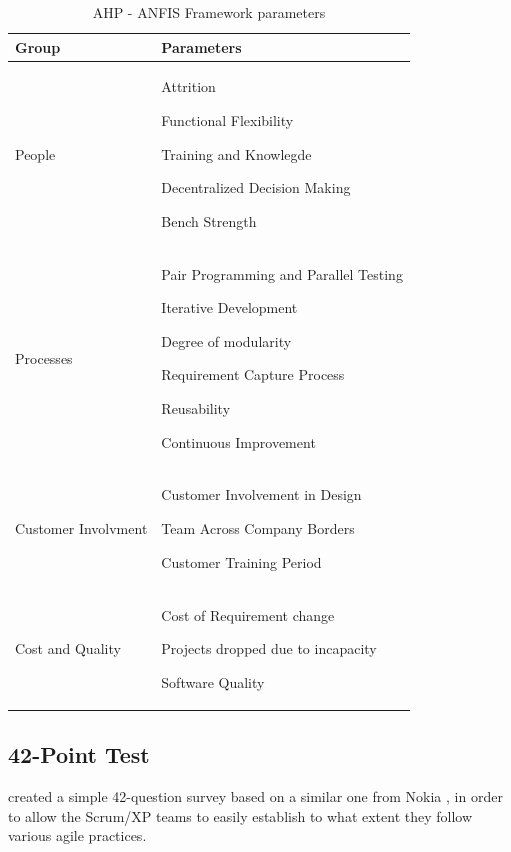 \begin{table} [H]
\begin{tabular}{| p{3cm} | p{12cm}|}
    \hline
     \textbf{Group} & \textbf{Parameters} \\ \hline
     People  &  \begin{inparaenum} [a\upshape)] \item Attrition \item Functional Flexibility \item Training and Knowlegde \item Decentralized Decision Making \item Bench Strength \end{inparaenum} \\ \hline
     Processes  & \begin{inparaenum} [a\upshape)] \item Pair Programming and Parallel Testing \item Iterative Development \item Degree of modularity \item Requirement Capture Process \item Reusability \item Continuous Improvement
     \end{inparaenum} \\ \hline
    Customer Involvment & \begin{inparaenum} [a\upshape)] \item Customer Involvement in Design \item Team Across Company Borders \item Customer Training Period \end{inparaenum} \\ \hline
     Cost and Quality  & \begin{inparaenum} [a\upshape)] \item Cost of Requirement change \item Projects dropped due to incapacity \item Software Quality \end{inparaenum} \\ \hline
  \end{tabular}
\caption{AHP - ANFIS Framework parameters}
\label{anfis_framework}
\end{table}

\subsection{42-Point Test}
\citet{42points} created a simple 42-question survey based on a similar one from Nokia \cite{nokia}, in order to allow the Scrum/XP teams to easily establish to what extent they follow various agile practices.

